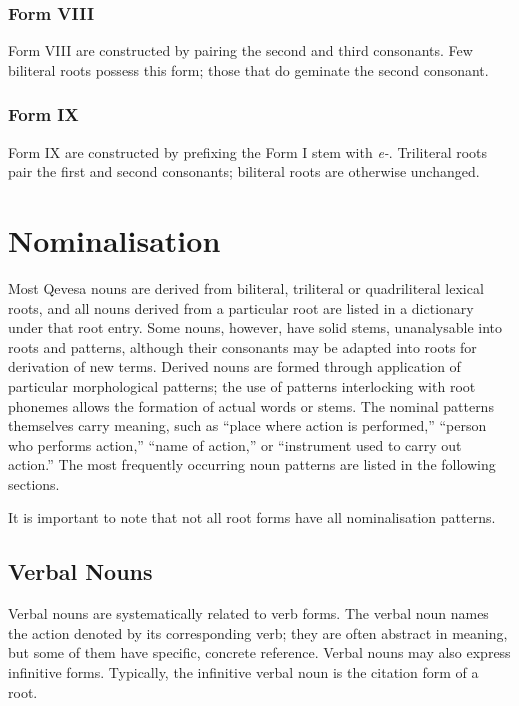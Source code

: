 \documentclass[grammar]{subfiles}
\begin{document}
	\subsubsection{Form VIII}
	\label{sssec:dev_verb_form_viii}

	Form VIII are constructed by pairing the second and third consonants. Few biliteral roots possess this form; those that do geminate the second consonant.

	\subsubsection{Form IX}
	\label{sssec:dev_verb_form_ix}

	Form IX are constructed by prefixing the Form I stem with \textit{e-}. Triliteral roots pair the first and second consonants; biliteral roots are otherwise unchanged.

	\section{Nominalisation}
	\label{sec:dev_nominalisation}

	Most Qevesa nouns are derived from biliteral, triliteral or quadriliteral lexical roots, and all nouns derived from a particular root are listed in a dictionary under that root entry. Some nouns, however, have solid stems, unanalysable into roots and patterns, although their consonants may be adapted into roots for derivation of new terms. Derived nouns are formed through application of particular morphological patterns; the use of patterns interlocking with root phonemes allows the formation of actual words or stems. The nominal patterns themselves carry meaning, such as “place where action is performed,” “person who performs action,” “name of action,” or “instrument used to carry out action.” The most frequently occurring noun patterns are listed in the following sections.

	It is important to note that not all root forms have all nominalisation patterns.

	\subsection{Verbal Nouns}
	\label{ssec:dev_verbal_nouns}

	Verbal nouns are systematically related to verb forms. The verbal noun names the action denoted by its corresponding verb; they are often abstract in meaning, but some of them have specific, concrete reference. Verbal nouns may also express infinitive forms. Typically, the infinitive verbal noun is the citation form of a root.
\end{document}
